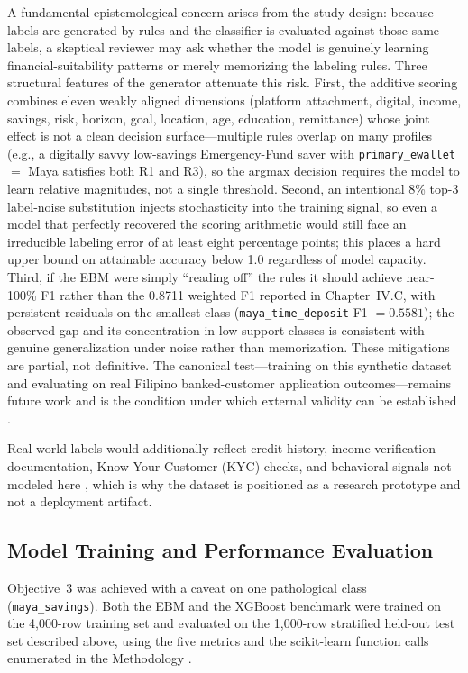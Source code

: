 \documentclass[journal]{./IEEE/IEEEtran}
\begin{document}
A fundamental epistemological concern arises from the study design: because labels are generated by rules and the classifier is evaluated against those same labels, a skeptical reviewer may ask whether the model is genuinely learning financial-suitability patterns or merely memorizing the labeling rules. Three structural features of the generator attenuate this risk. First, the additive scoring combines eleven weakly aligned dimensions (platform attachment, digital, income, savings, risk, horizon, goal, location, age, education, remittance) whose joint effect is not a clean decision surface---multiple rules overlap on many profiles (e.g., a digitally savvy low-savings Emergency-Fund saver with \texttt{primary\_ewallet} $=$ Maya satisfies both R1 and R3), so the argmax decision requires the model to learn relative magnitudes, not a single threshold. Second, an intentional 8\% top-3 label-noise substitution injects stochasticity into the training signal, so even a model that perfectly recovered the scoring arithmetic would still face an irreducible labeling error of at least eight percentage points; this places a hard upper bound on attainable accuracy below 1.0 regardless of model capacity. Third, if the EBM were simply ``reading off'' the rules it should achieve near-100\% F1 rather than the 0.8711 weighted F1 reported in Chapter~IV.C, with persistent residuals on the smallest class (\texttt{maya\_time\_deposit} F1 $=0.5581$); the observed gap and its concentration in low-support classes is consistent with genuine generalization under noise rather than memorization. These mitigations are partial, not definitive. The canonical test---training on this synthetic dataset and evaluating on real Filipino banked-customer application outcomes---remains future work and is the condition under which external validity can be established \cite{ref46}.

Real-world labels would additionally reflect credit history, income-verification documentation, Know-Your-Customer (KYC) checks, and behavioral signals not modeled here \cite{ref46}, which is why the dataset is positioned as a research prototype and not a deployment artifact.

\subsection{Model Training and Performance Evaluation}

Objective~3 was achieved with a caveat on one pathological class (\texttt{maya\_savings}). Both the EBM and the XGBoost benchmark were trained on the 4{,}000-row training set and evaluated on the 1{,}000-row stratified held-out test set described above, using the five metrics and the scikit-learn function calls enumerated in the Methodology \cite{ref74}.
\end{document}

